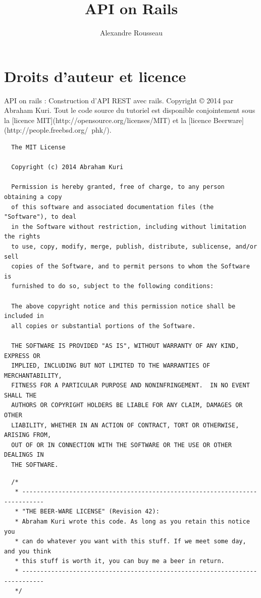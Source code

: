 \documentclass[]{report}
\title{API on Rails}
\author{Alexandre Rousseau}
\begin{document}
\maketitle

\newpage

\tableofcontents
\newpage


\chapter{Droits d'auteur et licence}

  API on rails : Construction d'API REST avec rails. Copyright © 2014 par Abraham Kuri. Tout le code source du tutoriel est disponible conjointement sous la [licence MIT](http://opensource.org/licenses/MIT) et la [licence Beerware](http://people.freebsd.org/~phk/).

  \begin{scriptsize}
  \begin{lstlisting}
  The MIT License

  Copyright (c) 2014 Abraham Kuri

  Permission is hereby granted, free of charge, to any person obtaining a copy
  of this software and associated documentation files (the "Software"), to deal
  in the Software without restriction, including without limitation the rights
  to use, copy, modify, merge, publish, distribute, sublicense, and/or sell
  copies of the Software, and to permit persons to whom the Software is
  furnished to do so, subject to the following conditions:

  The above copyright notice and this permission notice shall be included in
  all copies or substantial portions of the Software.

  THE SOFTWARE IS PROVIDED "AS IS", WITHOUT WARRANTY OF ANY KIND, EXPRESS OR
  IMPLIED, INCLUDING BUT NOT LIMITED TO THE WARRANTIES OF MERCHANTABILITY,
  FITNESS FOR A PARTICULAR PURPOSE AND NONINFRINGEMENT.  IN NO EVENT SHALL THE
  AUTHORS OR COPYRIGHT HOLDERS BE LIABLE FOR ANY CLAIM, DAMAGES OR OTHER
  LIABILITY, WHETHER IN AN ACTION OF CONTRACT, TORT OR OTHERWISE, ARISING FROM,
  OUT OF OR IN CONNECTION WITH THE SOFTWARE OR THE USE OR OTHER DEALINGS IN
  THE SOFTWARE.
  \end{lstlisting}
  \end{scriptsize}

  \begin{scriptsize}
  \begin{lstlisting}
  /*
   * ----------------------------------------------------------------------------
   * "THE BEER-WARE LICENSE" (Revision 42):
   * Abraham Kuri wrote this code. As long as you retain this notice you
   * can do whatever you want with this stuff. If we meet some day, and you think
   * this stuff is worth it, you can buy me a beer in return.
   * ----------------------------------------------------------------------------
   */
 \end{lstlisting}
 \end{scriptsize}
\end{document}
